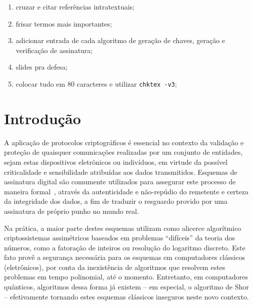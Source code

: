 \documentclass[12pt,notitlepage]{report}
\begin{document}
\newpage

\tableofcontents

\newpage

{\large
\begin{enumerate}
    \item cruzar e citar referências intratextuais;
    \item frisar termos mais importantes;
    \item adicionar entrada de cada algoritmo de geração de chaves, geração e verificação de assinatura;
    \item slides pra defesa;
    \item colocar tudo em 80 caracteres e utilizar \texttt{chktex -v3};
\end{enumerate}
}

\newpage

\chapter{Introdução}
\label{chapter:intro}

A aplicação de protocolos criptográficos é essencial no contexto da validação e
proteção de quaisquer comunicações realizadas por um conjunto de entidades,
sejam estas dispositivos eletrônicos ou indivíduos, em virtude da possível
criticalidade e sensibilidade atribuídas aos dados transmitidos. Esquemas de
assinatura digital são comumente utilizados para assegurar este processo de
maneira formal~\cite{Goldreich:2004:FCV:975541}, através da autenticidade e
não-repúdio do remetente e certeza da integridade dos dados, a fim de traduzir
o resguardo provido por uma assinatura de próprio punho no mundo real.

Na prática, a maior parte destes esquemas utilizam como alicerce algorítmico
criptossistemas assimétricos baseados em problemas ``difíceis'' da teoria dos
números, como a fatoração de inteiros ou resolução do logaritmo discreto.
Este fato provê a segurança necessária para os esquemas
em computadores clássicos (eletrônicos), por conta da inexistência de
algoritmos que resolvem estes problemas em tempo polinomial, até o momento.
Entretanto, em computadores quânticos, algoritmos dessa forma já existem -- em
especial, o algoritmo de Shor~\cite{Shor:1997:PAP:264393.264406} --
efetivamente tornando estes esquemas clássicos inseguros neste novo contexto.
\end{document}
